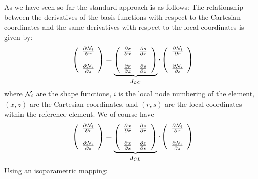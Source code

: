 As we have seen so far the standard approach is as follows:
The relationship between the derivatives of the basis functions with respect to the Cartesian coordinates and the same 
derivatives with respect to the local coordinates is given by:
\[
\left(
\begin{array}{c}
\frac{\partial {\mathcal{N}}_i}{\partial x} \\ \\
\frac{\partial {\mathcal{N}}_i}{\partial z} 
\end{array}
\right)
= 
\underbrace{\left(
\begin{array}{cc}
\frac{\partial r}{\partial x}  & 
\frac{\partial s}{\partial x}   \\ \\
\frac{\partial r}{\partial z}  & 
\frac{\partial s}{\partial z}  
\end{array}
\right)}_{{\bm J}_{LC}}
\cdot
\left(
\begin{array}{c}
\frac{\partial {\mathcal{N}}_i}{\partial r} \\ \\
\frac{\partial {\mathcal{N}}_i}{\partial s} 
\end{array}
\right)
\]
where ${\mathcal{N}}_i$ are the shape functions, $i$ is the local node numbering of the element, 
$(x,z)$ are the Cartesian coordinates, and $(r,s)$ are the local coordinates within the reference element.
We of course have
\[
\left(
\begin{array}{c}
\frac{\partial {\mathcal{N}}_i}{\partial r} \\ \\
\frac{\partial {\mathcal{N}}_i}{\partial s} 
\end{array}
\right)
= 
\underbrace{\left(
\begin{array}{cc}
\frac{\partial x}{\partial r}  & 
\frac{\partial z}{\partial r}   \\ \\
\frac{\partial x}{\partial s}  & 
\frac{\partial z}{\partial s}  
\end{array}
\right)}_{{\bm J}_{CL}}
\cdot
\left(
\begin{array}{c}
\frac{\partial {\mathcal{N}}_i}{\partial x} \\ \\
\frac{\partial {\mathcal{N}}_i}{\partial z} 
\end{array}
\right)
\]
Using an isoparametric mapping:
